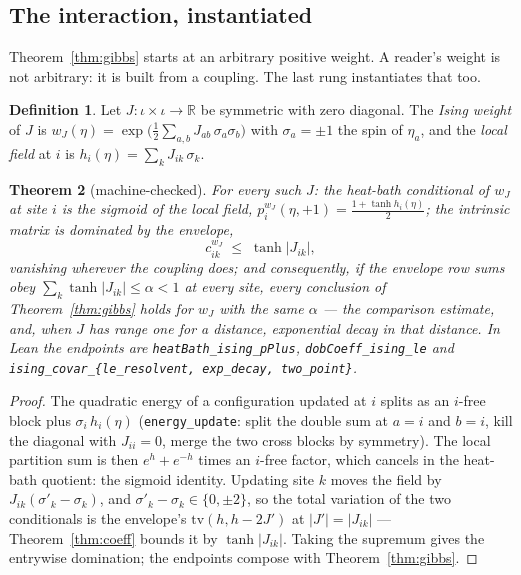 \documentclass[11pt]{article}
\newtheorem{theorem}{Theorem}[section]
\theoremstyle{definition}
\newtheorem{definition}[theorem]{Definition}
\newcommand{\R}{\mathbb{R}}
\begin{document}
\subsection*{The interaction, instantiated}

Theorem~\ref{thm:gibbs} starts at an arbitrary positive weight.  A reader's
weight is not arbitrary: it is built from a coupling.  The last rung
instantiates that too.

\begin{definition}
\label{def:ising}
Let $J:\iota\times\iota\to\R$ be symmetric with zero diagonal.  The
\emph{Ising weight} of $J$ is
$w_J(\eta)=\exp\bigl(\tfrac12\sum_{a,b}J_{ab}\,\sigma_a\sigma_b\bigr)$ with
$\sigma_a=\pm1$ the spin of $\eta_a$, and the \emph{local field} at $i$ is
$h_i(\eta)=\sum_k J_{ik}\,\sigma_k$.
\end{definition}

\begin{theorem}[machine-checked]
\label{thm:ising}
For every such $J$: the heat-bath conditional of $w_J$ at site $i$ is the
sigmoid of the local field,
$p^{w_J}_i(\eta,+1)=\tfrac{1+\tanh h_i(\eta)}{2}$; the intrinsic matrix is
dominated by the envelope,
\[
  c^{w_J}_{ik}\;\le\;\tanh\lvert J_{ik}\rvert ,
\]
vanishing wherever the coupling does; and consequently, if the \emph{envelope}
row sums obey $\sum_k\tanh|J_{ik}|\le\alpha<1$ at every site, every conclusion
of Theorem~\ref{thm:gibbs} holds for $w_J$ with the same $\alpha$ --- the
comparison estimate, and, when $J$ has range one for a distance, exponential
decay in that distance.  In Lean the endpoints are
\texttt{heatBath\_ising\_pPlus}, \texttt{dobCoeff\_ising\_le} and
\texttt{ising\_covar\_\{le\_resolvent, exp\_decay, two\_point\}}.
\end{theorem}

\begin{proof}
The quadratic energy of a configuration updated at $i$ splits as an $i$-free
block plus $\sigma_i\,h_i(\eta)$ (\texttt{energy\_update}: split the double
sum at $a=i$ and $b=i$, kill the diagonal with $J_{ii}=0$, merge the two
cross blocks by symmetry).  The local partition sum is then
$e^{h}+e^{-h}$ times an $i$-free factor, which cancels in the heat-bath
quotient: the sigmoid identity.  Updating site $k$ moves the field by
$J_{ik}(\sigma'_k-\sigma_k)$, and $\sigma'_k-\sigma_k\in\{0,\pm2\}$, so the
total variation of the two conditionals is the envelope's
$\mathrm{tv}(h,h-2J')$ at $|J'|=|J_{ik}|$ --- Theorem~\ref{thm:coeff}
bounds it by $\tanh|J_{ik}|$.  Taking the supremum gives the entrywise
domination; the endpoints compose with Theorem~\ref{thm:gibbs}.
\end{proof}
\end{document}
